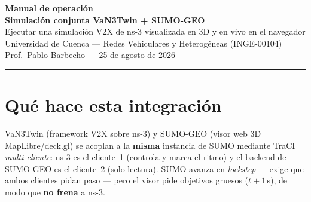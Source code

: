\documentclass[11pt,a4paper]{article}
\begin{document}
\begin{center}
  {\color{azul}\LARGE\bfseries Manual de operación}\\[4pt]
  {\color{azul}\Large\bfseries Simulación conjunta VaN3Twin + SUMO-GEO}\\[4pt]
  {\color{gris}\large Ejecutar una simulación V2X de ns-3 visualizada en 3D y en vivo en el navegador}\\[6pt]
  {\small Universidad de Cuenca --- Redes Vehiculares y Heterogéneas (INGE-00104)\\
  Prof.\ Pablo Barbecho --- 25 de agosto de 2026}
\end{center}

\vspace{2pt}
\hrule
\vspace{8pt}

\tableofcontents

\section{Qué hace esta integración}

VaN3Twin (framework V2X sobre ns-3) y SUMO-GEO (visor web 3D MapLibre/deck.gl)
se acoplan a la \textbf{misma} instancia de SUMO mediante TraCI
\emph{multi-cliente}: ns-3 es el cliente~1 (controla y marca el ritmo) y el
backend de SUMO-GEO es el cliente~2 (solo lectura). SUMO avanza en
\emph{lockstep} --- exige que ambos clientes pidan paso --- pero el visor pide
objetivos gruesos ($t+1$\,s), de modo que \textbf{no frena} a ns-3.
\end{document}
